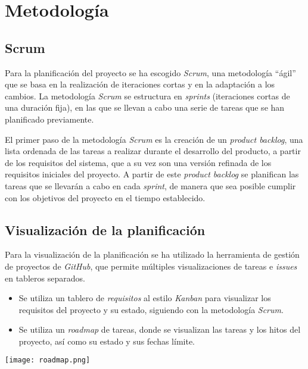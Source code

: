 \section{Metodología}\label{sec:metodología}
\subsection{Scrum}\label{subsec:scrum}
Para la planificación del proyecto se ha escogido \textit{Scrum}, una metodología ``ágil'' que se
basa en la realización de iteraciones cortas y en la adaptación a los cambios. La metodología
\textit{Scrum} se estructura en \textit{sprints} (iteraciones cortas de una duración fija),
en las que se llevan a cabo una serie de tareas que se han planificado previamente.

El primer paso de la metodología \textit{Scrum} es la creación de un \textit{product backlog},
una lista ordenada de las tareas a realizar durante el desarrollo del producto, a partir de los
requisitos del sistema, que a su vez son una versión refinada de los requisitos iniciales del
proyecto. A partir de este \textit{product backlog} se planifican las tareas que se llevarán
a cabo en cada \textit{sprint}, de manera que sea posible cumplir con los objetivos del proyecto
en el tiempo establecido.

\subsection{Visualización de la planificación}\label{subsec:visual_planif}
Para la visualización de la planificación se ha utilizado la herramienta de gestión de proyectos
de \textit{GitHub}, que permite múltiples visualizaciones de tareas e \textit{issues} en tableros
separados.

\begin{itemize}
	\item Se utiliza un tablero de \textit{requisitos} al estilo \textit{Kanban} para visualizar
		los requisitos del proyecto y su estado, siguiendo con la metodología \textit{Scrum}.
	\item Se utiliza un \textit{roadmap} de tareas, donde se visualizan las tareas y los hitos
		del proyecto, así como su estado y sus fechas límite.
\end{itemize}

\begin{minipage}{\linewidth}
	\texttt{[image: roadmap.png]}
\end{minipage}


